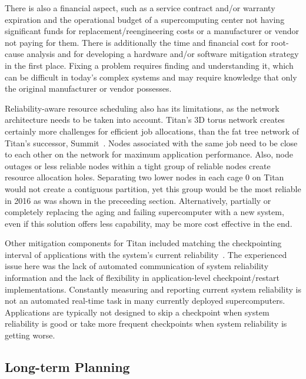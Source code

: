 There is also a financial aspect, such as a service contract and/or warranty
expiration and the operational budget of a supercomputing center not having
significant funds for replacement/reengineering costs or a manufacturer or
vendor not paying for them.
%
There is additionally the time and financial cost for root-cause analysis and
for developing a hardware and/or software mitigation strategy in the first place.
Fixing a problem requires finding and understanding it, which can be difficult 
in today's complex systems and may require knowledge that only the original 
manufacturer or vendor possesses.

Reliability-aware resource scheduling also has its limitations, as the network
architecture needs to be taken into account. Titan's 3D torus network creates
certainly more challenges for efficient job allocations, than the fat tree
network of Titan's successor, Summit~\cite{olcf:summit}. Nodes associated with
the same job need to be close to each other on the network for maximum
application performance. Also, node outages or less reliable nodes within a
tight group of reliable nodes create resource allocation
holes. Separating two lower nodes in each cage 0 on Titan would not
create a contiguous partition, yet this group would be the most
reliable in 2016 as was shown in the preceeding section.
%
Alternatively, partially or completely replacing the aging and failing
supercomputer with a new system, even if this solution offers less capability,
may be more cost effective in the end.

Other mitigation components for Titan included matching the checkpointing
interval of applications with the system's current
reliability~\cite{bautista-gomez16reducing, 6903564}. The experienced issue here
was the lack of automated communication of system reliability information and
the lack of flexibility in application-level checkpoint/restart implementations.
Constantly measuring and reporting current system reliability is not an automated
real-time task in many currently deployed supercomputers. Applications are
typically not designed to skip a checkpoint when system reliability is good or
take more frequent checkpoints when system reliability is getting worse.

\subsection{Long-term Planning}
\label{section:planning}

